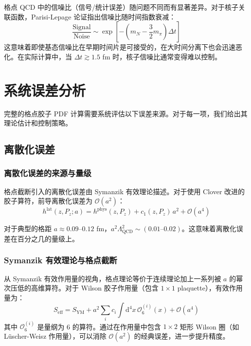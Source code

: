 \documentclass[11pt,a4paper]{ctexart}
\newcommand{\order}[1]{\mathcal{O}(#1)}
\begin{document}
格点 QCD 中的信噪比（信号/统计误差）随问题不同而有显著差异。对于核子关联函数，Parisi-Lepage 论证指出信噪比随时间指数衰减：
\begin{equation}
\frac{\text{Signal}}{\text{Noise}} \sim \exp\!\left[ -\left(m_N - \frac{3}{2}m_\pi\right) \Delta t \right]
\end{equation}
这意味着即使基态信噪比在早期时间片是可接受的，在大时间分离下也会迅速恶化。在实际计算中，当 $\Delta t \gtrsim 1.5$ fm 时，核子信噪比通常变得难以控制。

\section{系统误差分析}

完整的格点胶子 PDF 计算需要系统评估以下误差来源。对于每一项，我们给出其理论估计和控制策略。

\subsection{离散化误差}

\subsubsection{离散化误差的来源与量级}

格点截断引入的离散化误差由 Symanzik 有效理论描述。对于使用 Clover 改进的胶子算符，前导离散化误差为 $\order{a^2}$：
\begin{equation}
h^{\text{lat}}(z, P_z; a) = h^{\text{phys}}(z, P_z) + c_1(z, P_z) \, a^2 + \order{a^4}
\end{equation}

对于典型的格距 $a \approx 0.09\text{--}0.12$ fm，$a^2 \Lambda_{\text{QCD}}^2 \sim (0.01\text{--}0.02)$。这意味着离散化误差在百分之几的量级上。

\subsubsection{Symanzik 有效理论与格点截断}

从 Symanzik 有效作用量的视角，格点理论等价于连续理论加上一系列被 $a$ 的幂次压低的高维算符。对于 Wilson 胶子作用量（包含 $1\times 1$ plaquette），有效作用量为：
\begin{equation}
S_{\text{eff}} = S_{\text{YM}} + a^2 \sum_i c_i \int \mathrm{d}^4 x \, \mathcal{O}_6^{(i)}(x) + \order{a^4}
\end{equation}
其中 $\mathcal{O}_6^{(i)}$ 是量纲为 6 的算符。通过在作用量中包含 $1\times 2$ 矩形 Wilson 圈（如 Lüscher-Weisz 作用量），可以消除 $\order{a^2}$ 的经典误差，进一步提升精度。
\end{document}
